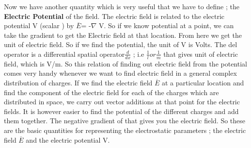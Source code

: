 Now we have another quantity which is very useful that we have to define ; the \textbf{Electric Potential} of the field. The electric field is related to the electric  potential V (scalar ) by 
$\overline{E}$= -$\nabla $ V.
So if we know potential at a point, we can take the gradient to get the Electric field at that location. From here we get the unit of electric field. So if we find the potential, the unit of V is Volts. The del operator is a differential spatial operator$\frac{d}{dx}$ ; i.e $\frac{1}{l} or\frac{1}{m}$ that gives unit of electric field, which is V/m. So this relation of finding out electric field from the potential comes very handy whenever we want to find electric field in a general complex distribution of charges. If we find the electric field  $\overline{E}$ at a particular location and find the component of the electric field for each of the charges which are distributed in space, we carry out vector additions at that point for the electric fields. It is however easier to find the potential of the different charges and add them together. The negative gradient of that gives you the electric field. So these are the basic quantities for representing the electrostatic parameters ; the electric field  $\overline{E}$ and the electric potential V.
